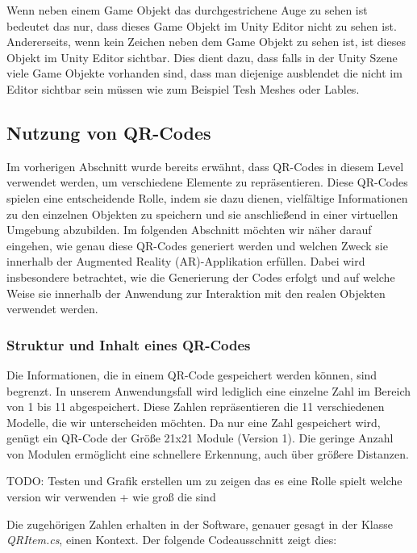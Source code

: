 Wenn neben einem Game Objekt das durchgestrichene Auge zu sehen ist bedeutet das nur, dass dieses Game Objekt im Unity Editor nicht zu sehen ist. Andererseits, wenn kein Zeichen
neben dem Game Objekt zu sehen ist, ist dieses Objekt im Unity Editor sichtbar. Dies dient dazu, dass falls in der Unity Szene viele Game Objekte vorhanden sind, dass man
diejenige ausblendet die nicht im Editor sichtbar sein müssen wie zum Beispiel Tesh Meshes oder Lables.

\subsection{Nutzung von QR-Codes} 
Im vorherigen Abschnitt wurde bereits erwähnt, dass QR-Codes in diesem Level verwendet werden, um verschiedene Elemente
zu repräsentieren. Diese QR-Codes spielen eine entscheidende Rolle, indem sie dazu dienen, vielfältige Informationen zu
den einzelnen Objekten zu speichern und sie anschließend in einer virtuellen Umgebung abzubilden. Im folgenden Abschnitt
möchten wir näher darauf eingehen, wie genau diese QR-Codes generiert werden und welchen Zweck sie innerhalb der
Augmented Reality (AR)-Applikation erfüllen. Dabei wird insbesondere betrachtet, wie die Generierung der Codes erfolgt
und auf welche Weise sie innerhalb der Anwendung zur Interaktion mit den realen Objekten verwendet werden.

\subsubsection{Struktur und Inhalt eines QR-Codes}
Die Informationen, die in einem QR-Code gespeichert werden können, sind begrenzt. In unserem Anwendungsfall wird lediglich
eine einzelne Zahl im Bereich von 1 bis 11 abgespeichert. Diese Zahlen repräsentieren die 11 verschiedenen Modelle, die
wir unterscheiden möchten. Da nur eine Zahl gespeichert wird, genügt ein QR-Code der Größe 21x21 Module (Version 1). Die
geringe Anzahl von Modulen ermöglicht eine schnellere Erkennung, auch über größere Distanzen.

TODO: Testen und Grafik erstellen um zu zeigen das es eine Rolle spielt welche version wir verwenden + wie groß die sind

Die zugehörigen Zahlen erhalten in der Software, genauer gesagt in der Klasse \textit{QRItem.cs}, einen Kontext. Der folgende Codeausschnitt zeigt dies:

